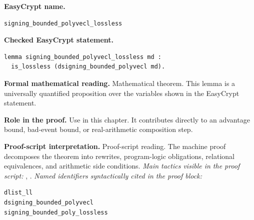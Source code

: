 \begin{formaltheorem}
\noindent\textbf{EasyCrypt name.}
\begin{lstlisting}[language=EasyCrypt,basicstyle=\ttfamily\scriptsize]
signing_bounded_polyvecl_lossless
\end{lstlisting}
\noindent\textbf{Checked EasyCrypt statement.}
\begin{lstlisting}[language=EasyCrypt,basicstyle=\ttfamily\scriptsize]
lemma signing_bounded_polyvecl_lossless md :
  is_lossless (dsigning_bounded_polyvecl md).
\end{lstlisting}
\noindent\textbf{Formal mathematical reading.}
Mathematical theorem. This lemma is a universally quantified proposition over the variables shown in the EasyCrypt statement.

\noindent\textbf{Role in the proof.}
Use in this chapter. It contributes directly to an advantage bound, bad-event bound, or real-arithmetic composition step.

\noindent\textbf{Proof-script interpretation.}
Proof-script reading. The machine proof decomposes the theorem into rewrites, program-logic obligations, relational equivalences, and arithmetic side conditions.
\emph{Main tactics visible in the proof script:} , .
\emph{Named identifiers syntactically cited in the proof block:}
\begin{lstlisting}[language=EasyCrypt,basicstyle=\ttfamily\scriptsize]
dlist_ll
dsigning_bounded_polyvecl
signing_bounded_poly_lossless
\end{lstlisting}

\end{formaltheorem}


